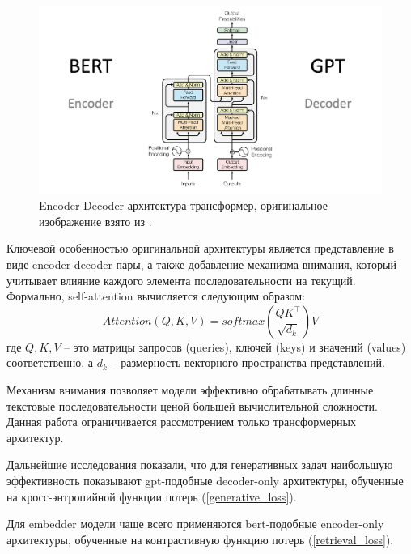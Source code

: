 \begin{figure}[ht!]
    \centering
    \includegraphics[scale=0.45]{images/transformers.png}
    \caption{Encoder-Decoder архитектура трансформер, оригинальное изображение взято из \cite{transformer}.}
    \label{transformer}
\end{figure}

Ключевой особенностью оригинальной архитектуры является представление в виде encoder-decoder пары, а также добавление механизма внимания, который учитывает влияние каждого элемента последовательности на текущий. Формально, self-attention вычисляется следующим образом:
\begin{equation}
    Attention(Q, K, V) = softmax(\frac{Q K^{\top}}{\sqrt{d_k}})V
\end{equation}
где $Q, K, V$ -- это матрицы запросов (queries), ключей (keys) и значений (values) соответственно, а $d_k$ -- размерность векторного пространства представлений.

Механизм внимания позволяет модели эффективно обрабатывать длинные текстовые последовательности ценой большей вычислительной сложности. Данная работа ограничивается рассмотрением только трансформерных архитектур. 

Дальнейшие исследования показали, что для генеративных задач наибольшую эффективность показывают gpt-подобные decoder-only архитектуры, обученные на кросс-энтропийной функции потерь (\ref{generative_loss}). 

Для embedder модели чаще всего применяются bert-подобные encoder-only архитектуры, обученные на контрастивную функцию потерь (\ref{retrieval_loss}).





